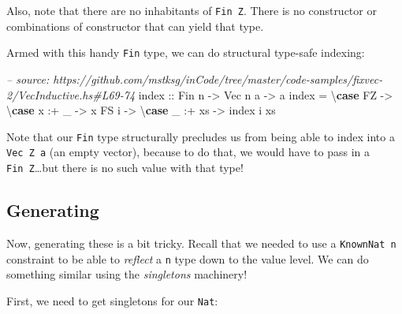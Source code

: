 \documentclass[]{article}
\newenvironment{Shaded}{}{}
\newcommand{\KeywordTok}[1]{\textcolor[rgb]{0.00,0.44,0.13}{\textbf{#1}}}
\newcommand{\DataTypeTok}[1]{\textcolor[rgb]{0.56,0.13,0.00}{#1}}
\newcommand{\CharTok}[1]{\textcolor[rgb]{0.25,0.44,0.63}{#1}}
\newcommand{\CommentTok}[1]{\textcolor[rgb]{0.38,0.63,0.69}{\textit{#1}}}
\newcommand{\OtherTok}[1]{\textcolor[rgb]{0.00,0.44,0.13}{#1}}
\newcommand{\FunctionTok}[1]{\textcolor[rgb]{0.02,0.16,0.49}{#1}}
\newcommand{\NormalTok}[1]{#1}
\begin{document}
Also, note that there are no inhabitants of \texttt{Fin\ \textquotesingle{}Z}.
There is no constructor or combinations of constructor that can yield that type.

Armed with this handy \texttt{Fin} type, we can do structural type-safe
indexing:

\begin{Shaded}
\begin{Highlighting}[]
\CommentTok{-- source: https://github.com/mstksg/inCode/tree/master/code-samples/fixvec-2/VecInductive.hs#L69-74}
\NormalTok{index}\OtherTok{ ::} \DataTypeTok{Fin}\NormalTok{ n }\OtherTok{->} \DataTypeTok{Vec}\NormalTok{ n a }\OtherTok{->}\NormalTok{ a}
\NormalTok{index }\FunctionTok{=}\NormalTok{ \textbackslash{}}\KeywordTok{case}
    \DataTypeTok{FZ} \OtherTok{->}\NormalTok{ \textbackslash{}}\KeywordTok{case}
\NormalTok{      x }\FunctionTok{:+}\NormalTok{ _ }\OtherTok{->}\NormalTok{ x}
    \DataTypeTok{FS}\NormalTok{ i }\OtherTok{->}\NormalTok{ \textbackslash{}}\KeywordTok{case}
\NormalTok{      _ }\FunctionTok{:+}\NormalTok{ xs }\OtherTok{->}\NormalTok{ index i xs}
\end{Highlighting}
\end{Shaded}

Note that our \texttt{Fin} type structurally precludes us from being able to
index into a \texttt{Vec\ \textquotesingle{}Z\ a} (an empty vector), because to
do that, we would have to pass in a \texttt{Fin\ \textquotesingle{}Z}\ldots{}but
there is no such value with that type!

\subsection{Generating}\label{generating-1}

Now, generating these is a bit tricky. Recall that we needed to use a
\texttt{KnownNat\ n} constraint to be able to \emph{reflect} a \texttt{n} type
down to the value level. We can do something similar using the \emph{singletons}
machinery!

First, we need to get singletons for our \texttt{Nat}:

\begin{Shaded}
\end{Shaded}
\end{document}
